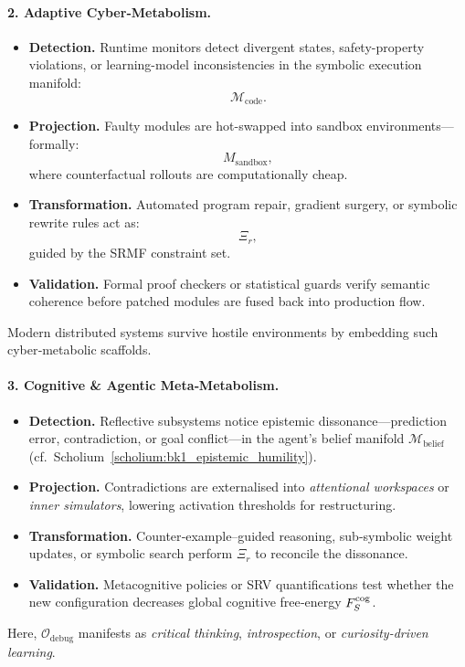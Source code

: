 \begin{scholium}
\paragraph{2. Adaptive Cyber‑Metabolism.}
\begin{itemize}
    \item \textbf{Detection.} 
    Runtime monitors detect divergent states, safety-property violations, 
    or learning-model inconsistencies in the symbolic execution manifold:
    \[
    \mathcal{M}_{\mathrm{code}}.
    \]
    \item \textbf{Projection.} 
    Faulty modules are hot-swapped into sandbox environments—formally:
    \[
    M_{\mathrm{sandbox}},
    \]
    where counterfactual rollouts are computationally cheap.
    \item \textbf{Transformation.} 
    Automated program repair, gradient surgery, or symbolic rewrite rules act as:
    \[
    \Xi_r,
    \]
    guided by the SRMF constraint set.
    \item \textbf{Validation.} 
    Formal proof checkers or statistical guards verify semantic coherence 
    before patched modules are fused back into production flow.
\end{itemize}
Modern distributed systems survive  hostile environments by embedding such cyber‑metabolic scaffolds.
\paragraph{3. Cognitive \& Agentic Meta‑Metabolism.}
\begin{itemize}
  \item \textbf{Detection.} Reflective subsystems notice epistemic
        dissonance—prediction error, contradiction, or goal conflict—in
        the agent’s belief manifold $\mathcal{M}_{\mathrm{belief}}$ (cf.~Scholium~\ref{scholium:bk1_epistemic_humility}).
  \item \textbf{Projection.} Contradictions are externalised into
        \emph{attentional workspaces} or \emph{inner simulators},
        lowering activation thresholds for restructuring.
  \item \textbf{Transformation.} Counter‑example–guided reasoning,
        sub‑symbolic weight updates, or symbolic search perform $\Xi_r$
        to reconcile the dissonance.
  \item \textbf{Validation.} Metacognitive policies or SRV
        quantifications test whether the new configuration decreases
        global cognitive free‑energy $F_S^{\mathrm{cog}}$.
\end{itemize}
Here, $\mathcal{O}_{\text{debug}}$ manifests as
\emph{critical thinking}, \emph{introspection}, or
\emph{curiosity‑driven learning}.

\end{scholium}
